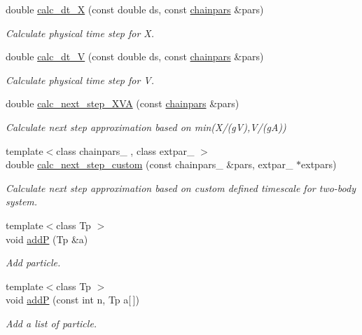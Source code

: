 \begin{DoxyCompactItemize}
double \hyperlink{classARC_1_1chain_afe66b8b83172bbe5c3d4375e76ce135f}{calc\+\_\+dt\+\_\+X} (const double ds, const \hyperlink{classARC_1_1chainpars}{chainpars} \&pars)
\begin{DoxyCompactList}\small\item\em Calculate physical time step for X. \end{DoxyCompactList}\item 
double \hyperlink{classARC_1_1chain_a000772c395f316bbda100e58e1dc7db4}{calc\+\_\+dt\+\_\+V} (const double ds, const \hyperlink{classARC_1_1chainpars}{chainpars} \&pars)
\begin{DoxyCompactList}\small\item\em Calculate physical time step for V. \end{DoxyCompactList}\item 
double \hyperlink{classARC_1_1chain_ae09a8f3826db280d8bdcf9d40085bf3a}{calc\+\_\+next\+\_\+step\+\_\+\+X\+VA} (const \hyperlink{classARC_1_1chainpars}{chainpars} \&pars)
\begin{DoxyCompactList}\small\item\em Calculate next step approximation based on min(X/(gV),V/(gA)) \end{DoxyCompactList}\item 
{\footnotesize template$<$class chainpars\+\_\+ , class extpar\+\_\+ $>$ }\\double \hyperlink{classARC_1_1chain_a368f78726cba200f698ed0925f61d4fd}{calc\+\_\+next\+\_\+step\+\_\+custom} (const chainpars\+\_\+ \&pars, extpar\+\_\+ $\ast$extpars)
\begin{DoxyCompactList}\small\item\em Calculate next step approximation based on custom defined timescale for two-\/body system. \end{DoxyCompactList}\item 
{\footnotesize template$<$class Tp $>$ }\\void \hyperlink{classARC_1_1chain_a2df655cb46fcb7e892f196340e7d5c83}{addP} (Tp \&a)
\begin{DoxyCompactList}\small\item\em Add particle. \end{DoxyCompactList}\item 
{\footnotesize template$<$class Tp $>$ }\\void \hyperlink{classARC_1_1chain_afe416c7e33c99c4e9cdd1391bae332ec}{addP} (const int n, Tp a\mbox{[}$\,$\mbox{]})
\begin{DoxyCompactList}\small\item\em Add a list of particle. \end{DoxyCompactList}\item 

\end{DoxyCompactItemize}
